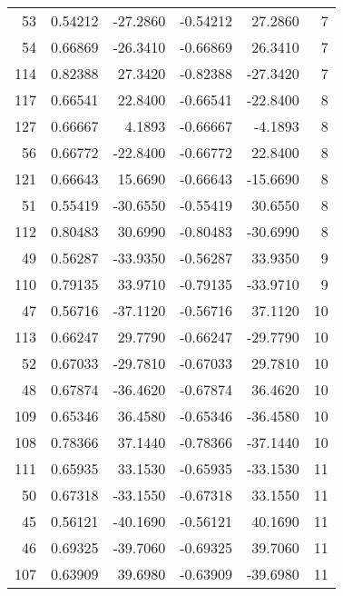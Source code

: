 \begin{tabular}{rrrrrr}
 53 &  0.54212 & -27.2860 &    -0.54212 &     27.2860 &   7 \\
 54 &  0.66869 & -26.3410 &    -0.66869 &     26.3410 &   7 \\
114 &  0.82388 &  27.3420 &    -0.82388 &    -27.3420 &   7 \\
117 &  0.66541 &  22.8400 &    -0.66541 &    -22.8400 &   8 \\
127 &  0.66667 &   4.1893 &    -0.66667 &     -4.1893 &   8 \\
 56 &  0.66772 & -22.8400 &    -0.66772 &     22.8400 &   8 \\
121 &  0.66643 &  15.6690 &    -0.66643 &    -15.6690 &   8 \\
 51 &  0.55419 & -30.6550 &    -0.55419 &     30.6550 &   8 \\
112 &  0.80483 &  30.6990 &    -0.80483 &    -30.6990 &   8 \\
 49 &  0.56287 & -33.9350 &    -0.56287 &     33.9350 &   9 \\
110 &  0.79135 &  33.9710 &    -0.79135 &    -33.9710 &   9 \\
 47 &  0.56716 & -37.1120 &    -0.56716 &     37.1120 &  10 \\
113 &  0.66247 &  29.7790 &    -0.66247 &    -29.7790 &  10 \\
 52 &  0.67033 & -29.7810 &    -0.67033 &     29.7810 &  10 \\
 48 &  0.67874 & -36.4620 &    -0.67874 &     36.4620 &  10 \\
109 &  0.65346 &  36.4580 &    -0.65346 &    -36.4580 &  10 \\
108 &  0.78366 &  37.1440 &    -0.78366 &    -37.1440 &  10 \\
111 &  0.65935 &  33.1530 &    -0.65935 &    -33.1530 &  11 \\
 50 &  0.67318 & -33.1550 &    -0.67318 &     33.1550 &  11 \\
 45 &  0.56121 & -40.1690 &    -0.56121 &     40.1690 &  11 \\
 46 &  0.69325 & -39.7060 &    -0.69325 &     39.7060 &  11 \\
107 &  0.63909 &  39.6980 &    -0.63909 &    -39.6980 &  11 \\
\bottomrule
\end{tabular}
